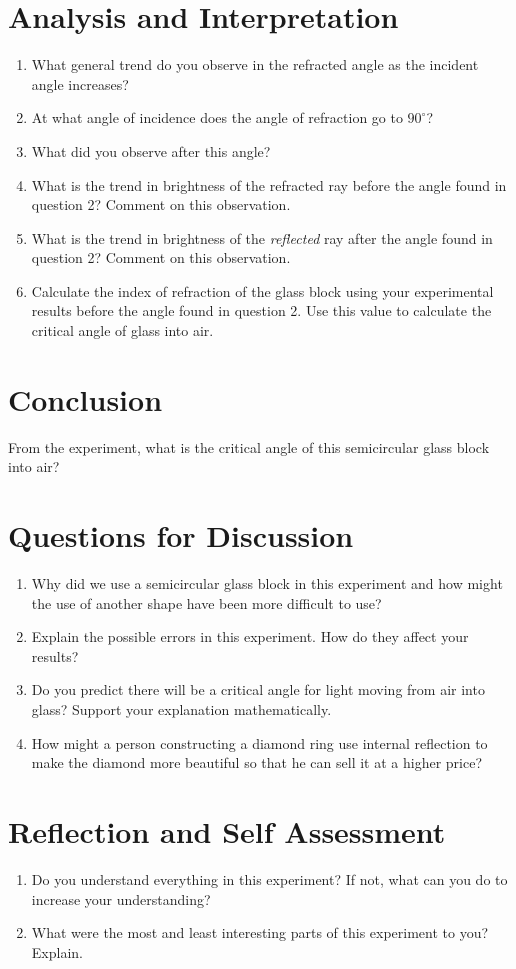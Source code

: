 
\section{Analysis and Interpretation}
\begin{enumerate}
\item What general trend do you observe in the refracted angle as the incident angle increases?
\item At what angle of incidence does the angle of refraction go to $90^\circ$? 
\item What did you observe after this angle? 
\item What is the trend in brightness of the refracted ray before the angle found in question 2? Comment on this observation.
\item What is the trend in brightness of the \emph{reflected} ray after the angle found in question 2? Comment on this observation.
\item Calculate the index of refraction of the glass block using your experimental results before the angle found in question 2. Use this value to calculate the critical angle of glass into air. 
\end{enumerate}

\section{Conclusion}
From the experiment, what is the critical angle of this semicircular glass block into air?

\section{Questions for Discussion}
\begin{enumerate}
\item Why did we use a semicircular glass block in this experiment and how might the use of another shape have been more difficult to use?
\item Explain the possible errors in this experiment. How do they affect your results?
\item Do you predict there will be a critical angle for light moving from air into glass? Support your explanation mathematically.
\item How might a person constructing a diamond ring use internal reflection to make the diamond more beautiful so that he can sell it at a higher price?
\end{enumerate}

\section{Reflection and Self Assessment}
\begin{enumerate}
\item Do you understand everything in this experiment? If not, what can you do to increase your understanding?
\item What were the most and least interesting parts of this experiment to you? Explain.
\end{enumerate}